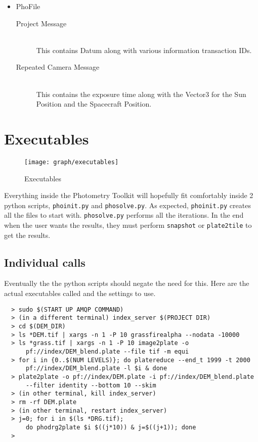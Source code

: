 \begin{itemize}
  \item PhoFile \hfill \\
    \begin{description}
      \item[Project Message] \hfill \\
        This contains Datum along with various information transaction
        IDs.
      \item[Repeated Camera Message] \hfill \\
        This contains the exposure time along with the Vector3 for the
        Sun Position and the Spacecraft Position.
    \end{description}
\end{itemize}

\section{Executables}

\begin{wrapfigure}{r}{0.5\textwidth}
  \vspace{-50pt}
  \begin{center}
    \texttt{[image: graph/executables]}
  \end{center}
  \caption{Executables}
\end{wrapfigure}

Everything inside the Photometry Toolkit will hopefully fit
comfortably inside 2 python scripts, \texttt{phoinit.py} and
\texttt{phosolve.py}. As expected, \texttt{phoinit.py} creates all the
files to start with. \texttt{phosolve.py} performs all the
iterations. In the end when the user wants the results, they must
perform \texttt{snapshot} or \texttt{plate2tile} to get the results.

\subsection{Individual calls}

Eventually the the python scripts should negate the need for
this. Here are the actual executables called and the settings to use.

\begin{verbatim}
  > sudo $(START UP AMQP COMMAND)
  > (in a different terminal) index_server $(PROJECT DIR)
  > cd $(DEM_DIR)
  > ls *DEM.tif | xargs -n 1 -P 10 grassfirealpha --nodata -10000
  > ls *grass.tif | xargs -n 1 -P 10 image2plate -o
      pf://index/DEM_blend.plate --file tif -m equi
  > for i in {0..$(NUM LEVELS)}; do platereduce --end_t 1999 -t 2000
      pf://index/DEM_blend.plate -l $i & done
  > plate2plate -o pf://index/DEM.plate -i pf://index/DEM_blend.plate
      --filter identity --bottom 10 --skim
  > (in other terminal, kill index_server)
  > rm -rf DEM.plate
  > (in other terminal, restart index_server)
  > j=0; for i in $(ls *DRG.tif);
      do phodrg2plate $i $((j*10)) & j=$((j+1)); done
  >
\end{verbatim}
